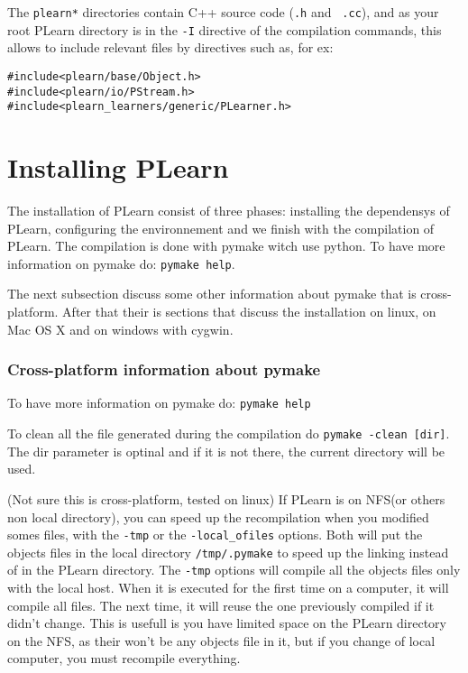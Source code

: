 \documentclass[11pt]{book}
\begin{document}
The \verb!plearn*! directories contain C++ source code ({\tt .h} and {\tt
  .cc}), and as your root PLearn directory is in the \verb!-I! directive of
the compilation commands, this allows to include relevant files by
directives such as, for ex:
\begin{verbatim}
#include<plearn/base/Object.h>
#include<plearn/io/PStream.h>
#include<plearn_learners/generic/PLearner.h>
\end{verbatim}



\chapter{Installing PLearn}

The installation of PLearn consist of three phases: installing the dependensys of PLearn, configuring the environnement and we finish with the compilation of PLearn. The compilation is done with pymake witch use python. To have more information on pymake do: \verb!pymake help!. 


The next subsection discuss some other information about pymake that is cross-platform. After that their is sections that discuss the installation on linux, on Mac OS X and on windows with cygwin.

\subsection{Cross-platform information about pymake}
To have more information on pymake do: \verb!pymake help!

To clean all the file generated during the compilation do \verb!pymake -clean [dir]!. The dir parameter is optinal and if it is not there, the current directory will be used.

(Not sure this is cross-platform, tested on linux)
If PLearn is on NFS(or others non local directory), you can speed up the
recompilation when you modified somes files, with the \verb!-tmp! or the
\verb!-local_ofiles! options. Both will put the objects files in the
local directory \verb!/tmp/.pymake! to speed up the linking instead of in the
PLearn directory. 
The \verb!-tmp! options will compile all the objects files only with the local host.
When it is executed for the first
time on a computer, it will compile all files. The next time, it will reuse the one
previously compiled if it didn't change. This is usefull is you have
limited space on the PLearn directory on the NFS, as their won't be
any objects
file in it, but if you change of local computer, you must recompile
everything.
\end{document}
